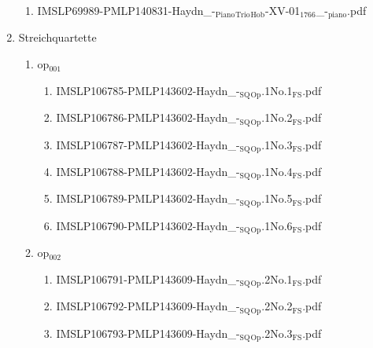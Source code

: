 \documentclass[11pt]{article}
\begin{document}
\begin{enumerate}
\begin{enumerate}
\item IMSLP69989-PMLP140831-Haydn\_-$_{\text{Piano}}$$_{\text{Trio}}$$_{\text{Hob}}$-XV-01$_{\text{1766}}$\_-$_{\text{piano}}$.pdf
\label{sec-1-1-1-1-44-38-5-22}
\end{enumerate}

\item Streichquartette
\label{sec-1-1-1-1-44-38-6}
\begin{enumerate}
\item op$_{\text{001}}$
\label{sec-1-1-1-1-44-38-6-1}
\begin{enumerate}
\item IMSLP106785-PMLP143602-Haydn\_-$_{\text{SQ}}$$_{\text{Op}}$.1No.1$_{\text{FS}}$.pdf
\label{sec-1-1-1-1-44-38-6-1-1}

\item IMSLP106786-PMLP143602-Haydn\_-$_{\text{SQ}}$$_{\text{Op}}$.1No.2$_{\text{FS}}$.pdf
\label{sec-1-1-1-1-44-38-6-1-2}

\item IMSLP106787-PMLP143602-Haydn\_-$_{\text{SQ}}$$_{\text{Op}}$.1No.3$_{\text{FS}}$.pdf
\label{sec-1-1-1-1-44-38-6-1-3}

\item IMSLP106788-PMLP143602-Haydn\_-$_{\text{SQ}}$$_{\text{Op}}$.1No.4$_{\text{FS}}$.pdf
\label{sec-1-1-1-1-44-38-6-1-4}

\item IMSLP106789-PMLP143602-Haydn\_-$_{\text{SQ}}$$_{\text{Op}}$.1No.5$_{\text{FS}}$.pdf
\label{sec-1-1-1-1-44-38-6-1-5}

\item IMSLP106790-PMLP143602-Haydn\_-$_{\text{SQ}}$$_{\text{Op}}$.1No.6$_{\text{FS}}$.pdf
\label{sec-1-1-1-1-44-38-6-1-6}
\end{enumerate}

\item op$_{\text{002}}$
\label{sec-1-1-1-1-44-38-6-2}
\begin{enumerate}
\item IMSLP106791-PMLP143609-Haydn\_-$_{\text{SQ}}$$_{\text{Op}}$.2No.1$_{\text{FS}}$.pdf
\label{sec-1-1-1-1-44-38-6-2-1}

\item IMSLP106792-PMLP143609-Haydn\_-$_{\text{SQ}}$$_{\text{Op}}$.2No.2$_{\text{FS}}$.pdf
\label{sec-1-1-1-1-44-38-6-2-2}

\item IMSLP106793-PMLP143609-Haydn\_-$_{\text{SQ}}$$_{\text{Op}}$.2No.3$_{\text{FS}}$.pdf
\label{sec-1-1-1-1-44-38-6-2-3}


\end{enumerate}
\end{enumerate}
\end{enumerate}
\end{document}

